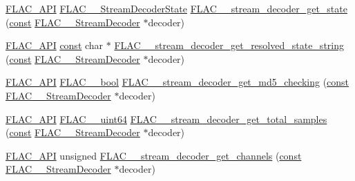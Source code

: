 \begin{DoxyCompactItemize}
\item 
\hyperlink{group__flac__export_ga56ca07df8a23310707732b1c0007d6f5}{F\+L\+A\+C\+\_\+\+A\+PI} \hyperlink{group__flac__stream__decoder_ga3adb6891c5871a87cd5bbae6c770ba2d}{F\+L\+A\+C\+\_\+\+\_\+\+Stream\+Decoder\+State} \hyperlink{group__flac__stream__decoder_ga5899c204ad7183ec04e41855090c0635}{F\+L\+A\+C\+\_\+\+\_\+stream\+\_\+decoder\+\_\+get\+\_\+state} (\hyperlink{zconf_8h_a2c212835823e3c54a8ab6d95c652660e}{const} \hyperlink{struct_f_l_a_c_____stream_decoder}{F\+L\+A\+C\+\_\+\+\_\+\+Stream\+Decoder} $\ast$decoder)
\item 
\hyperlink{group__flac__export_ga56ca07df8a23310707732b1c0007d6f5}{F\+L\+A\+C\+\_\+\+A\+PI} \hyperlink{zconf_8h_a2c212835823e3c54a8ab6d95c652660e}{const} char $\ast$ \hyperlink{group__flac__stream__decoder_ga0f086d3e2114f378b06e585ab6f4ff6b}{F\+L\+A\+C\+\_\+\+\_\+stream\+\_\+decoder\+\_\+get\+\_\+resolved\+\_\+state\+\_\+string} (\hyperlink{zconf_8h_a2c212835823e3c54a8ab6d95c652660e}{const} \hyperlink{struct_f_l_a_c_____stream_decoder}{F\+L\+A\+C\+\_\+\+\_\+\+Stream\+Decoder} $\ast$decoder)
\item 
\hyperlink{group__flac__export_ga56ca07df8a23310707732b1c0007d6f5}{F\+L\+A\+C\+\_\+\+A\+PI} \hyperlink{ordinals_8h_a95103469f1cbd78b8cf250194985b34e}{F\+L\+A\+C\+\_\+\+\_\+bool} \hyperlink{group__flac__stream__decoder_ga3b19d2a761ea61cc57b12e31a5c1adf6}{F\+L\+A\+C\+\_\+\+\_\+stream\+\_\+decoder\+\_\+get\+\_\+md5\+\_\+checking} (\hyperlink{zconf_8h_a2c212835823e3c54a8ab6d95c652660e}{const} \hyperlink{struct_f_l_a_c_____stream_decoder}{F\+L\+A\+C\+\_\+\+\_\+\+Stream\+Decoder} $\ast$decoder)
\item 
\hyperlink{group__flac__export_ga56ca07df8a23310707732b1c0007d6f5}{F\+L\+A\+C\+\_\+\+A\+PI} \hyperlink{ordinals_8h_aa78c8c70a3eb8a58af7436f278acde8e}{F\+L\+A\+C\+\_\+\+\_\+uint64} \hyperlink{group__flac__stream__decoder_ga68a80ea677bf4abb535abd8f28f2183c}{F\+L\+A\+C\+\_\+\+\_\+stream\+\_\+decoder\+\_\+get\+\_\+total\+\_\+samples} (\hyperlink{zconf_8h_a2c212835823e3c54a8ab6d95c652660e}{const} \hyperlink{struct_f_l_a_c_____stream_decoder}{F\+L\+A\+C\+\_\+\+\_\+\+Stream\+Decoder} $\ast$decoder)
\item 
\hyperlink{group__flac__export_ga56ca07df8a23310707732b1c0007d6f5}{F\+L\+A\+C\+\_\+\+A\+PI} unsigned \hyperlink{group__flac__stream__decoder_ga42b7d224faeee633e6359ac1f921f39a}{F\+L\+A\+C\+\_\+\+\_\+stream\+\_\+decoder\+\_\+get\+\_\+channels} (\hyperlink{zconf_8h_a2c212835823e3c54a8ab6d95c652660e}{const} \hyperlink{struct_f_l_a_c_____stream_decoder}{F\+L\+A\+C\+\_\+\+\_\+\+Stream\+Decoder} $\ast$decoder)

\end{DoxyCompactItemize}
